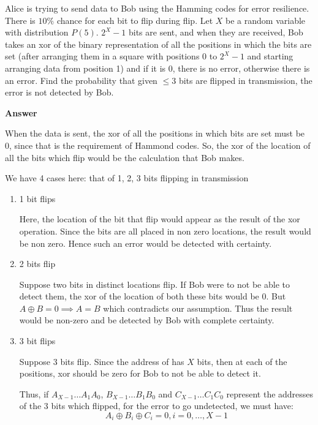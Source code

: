 \documentclass[12pt, oneside]{article}
\begin{document}
\begin{enumerate}
{    Alice is trying to send data to Bob using the Hamming codes for error resilience.
    There is \(10\%\) chance for each bit to flip during flip. Let \(X\) be a random
    variable with distribution \(P(5)\). \(2^X - 1\) bits are sent, and when they
    are received, Bob takes an xor of the binary representation of all the positions in
    which the bits are set (after arranging them in a square with positions 0 to \(2^X - 1\)
    and starting arranging data from position 1) and if it is 0, there is no error, 
    otherwise there is an error.
    Find the probability that given \(\leq 3\) bits are flipped in transmission, the error
    is not detected by Bob.

    \textbf{Answer}

    When the data is sent, the xor of all the positions in which bits are set must be
    0, since that is the requirement of Hammond codes. So, the xor of the location of all the
    bits which flip would be the calculation that Bob makes.

    We have 4 cases here: that of 1, 2, 3 bits flipping in transmission
    \begin{enumerate}
        \item {
            1 bit flips

            Here, the location of the bit that flip would appear as the result of the xor
            operation. Since the bits are all placed in non zero locations, the result
            would be non zero. Hence such an error would be detected with certainty.
        }
        \item {
            2 bits flip

            Suppose two bits in distinct locations flip. If Bob were to not be able to
            detect them, the xor of the location of both these bits would be 0.
            But \(A \oplus B = 0 \implies A = B\) which contradicts our assumption.
            Thus the result would be non-zero and be detected by Bob with complete
            certainty.
        }
        \item {
            3 bit flips

            Suppose 3 bits flip. Since the address of has \(X\) bits, then at each of
            the positions, xor should be zero for Bob to not be able to detect it.

            Thus, if \(A_{X-1}\ldots A_{1}A_{0}\), \(B_{X-1}\ldots B_{1}B_{0}\) and
            \(C_{X-1}\ldots C_{1}C_{0}\) represent the addresses of the 3 bits which
            flipped, for the error to go undetected, we must have:
            \[A_i \oplus B_i \oplus C_i = 0, i = 0, \ldots, X - 1\]

}
\end{enumerate}}
\end{enumerate}
\end{document}
